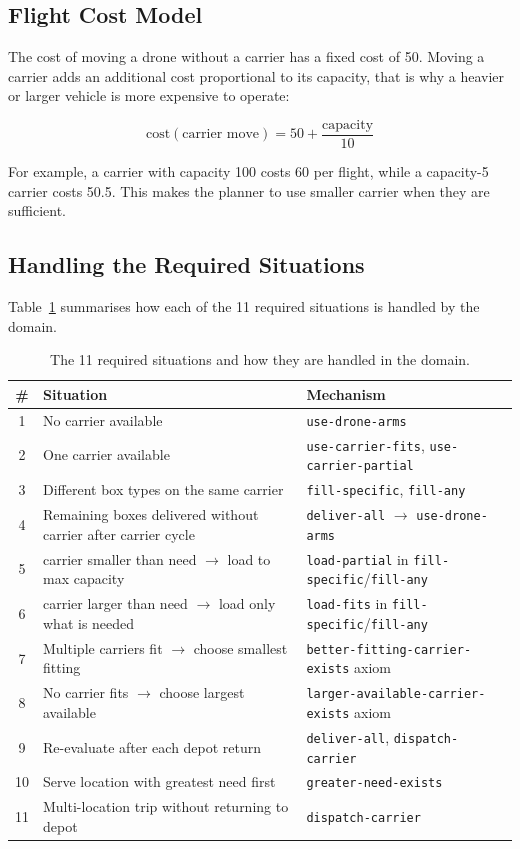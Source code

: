 \documentclass{article}
\begin{document}
\subsection{Flight Cost Model}

The cost of moving a drone without a carrier has a fixed cost of 50. Moving a carrier adds an additional cost proportional to its capacity, that is why a heavier or larger vehicle is more expensive to operate:

\[
  \text{cost}(\text{carrier move}) = 50 + \frac{\text{capacity}}{10}
\]

For example, a carrier with capacity 100 costs 60 per flight, while a capacity-5 carrier costs 50.5. This makes the planner to use smaller carrier when they are sufficient.

\subsection{Handling the Required Situations}

Table~\ref{tab:situations} summarises how each of the 11 required situations is handled by the domain.

\begin{table}[H]
\centering
\footnotesize
\begin{tabular}{|c|p{7.5cm}|p{4.5cm}|}
\hline
\textbf{\#} & \textbf{Situation} & \textbf{Mechanism} \\ \hline
1 & No carrier available & \texttt{use-drone-arms} \\ \hline
2 & One carrier available & \texttt{use-carrier-fits}, \texttt{use-carrier-partial} \\ \hline
3 & Different box types on the same carrier & \texttt{fill-specific}, \texttt{fill-any} \\ \hline
4 & Remaining boxes delivered without carrier after carrier cycle & \texttt{deliver-all} $\to$ \texttt{use-drone-arms} \\ \hline
5 & carrier smaller than need $\to$ load to max capacity & \texttt{load-partial} in \texttt{fill-specific}/\texttt{fill-any} \\ \hline
6 & carrier larger than need $\to$ load only what is needed & \texttt{load-fits} in \texttt{fill-specific}/\texttt{fill-any} \\ \hline
7 & Multiple carriers fit $\to$ choose smallest fitting & \texttt{better-fitting-carrier-exists} axiom \\ \hline
8 & No carrier fits $\to$ choose largest available & \texttt{larger-available-carrier-exists} axiom \\ \hline
9 & Re-evaluate after each depot return & \texttt{deliver-all}, \texttt{dispatch-carrier} \\ \hline
10 & Serve location with greatest need first & \texttt{greater-need-exists} \\ \hline
11 & Multi-location trip without returning to depot & \texttt{dispatch-carrier} \\ \hline
\end{tabular}
\caption{The 11 required situations and how they are handled in the domain.}
\label{tab:situations}
\end{table}
\end{document}
